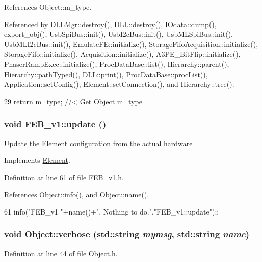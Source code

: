 References Object::m\_\-type.

Referenced by DLLMgr::destroy(), DLL::destroy(), IOdata::dump(), export\_\-obj(), UsbSpiBus::init(), UsbI2cBus::init(), UsbMLSpiBus::init(), UsbMLI2cBus::init(), EmulateFE::initialize(), StorageFifoAcquisition::initialize(), StorageFifo::initialize(), Acquisition::initialize(), A3PE\_\-BitFlip::initialize(), PhaserRampExec::initialize(), ProcDataBase::list(), Hierarchy::parent(), Hierarchy::pathTyped(), DLL::print(), ProcDataBase::procList(), Application::setConfig(), Element::setConnection(), and Hierarchy::tree().


\begin{DoxyCode}
29 { return m_type;       } //< Get Object m_type
\end{DoxyCode}
\hypertarget{classFEB__v1_a96ad348b7be37686998c0eaa7fd2e83e}{
\subsubsection[{update}]{\setlength{\rightskip}{0pt plus 5cm}void FEB\_\-v1::update ()}}
\label{classFEB__v1_a96ad348b7be37686998c0eaa7fd2e83e}
Update the \hyperlink{classElement}{Element} configuration from the actual hardware 

Implements \hyperlink{classElement_a4e6c83efae95616ebddd03c793a26661}{Element}.

Definition at line 61 of file FEB\_\-v1.h.

References Object::info(), and Object::name().


\begin{DoxyCode}
61 {info("FEB_v1 "+name()+". Nothing to do.","FEB_v1::update");};
\end{DoxyCode}
\hypertarget{classObject_a2d4120195317e2a3c6532e8bb9f3da68}{
\subsubsection[{verbose}]{\setlength{\rightskip}{0pt plus 5cm}void Object::verbose (std::string {\em mymsg}, \/  std::string {\em name})}}
\label{classObject_a2d4120195317e2a3c6532e8bb9f3da68}


Definition at line 44 of file Object.h.

